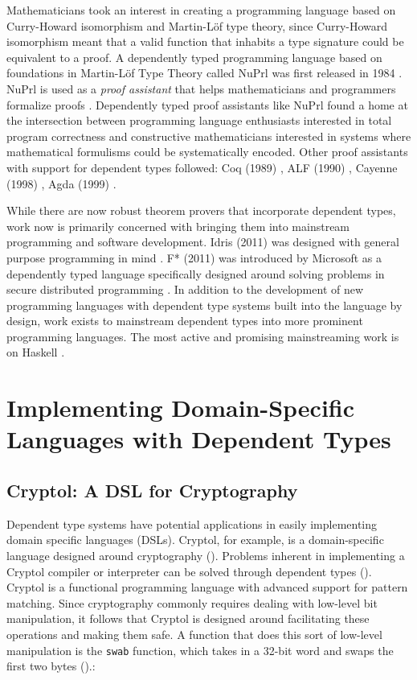 Mathematicians took an interest in creating a programming language based on
Curry-Howard isomorphism and Martin-L\"{o}f type theory, since Curry-Howard
isomorphism meant that a valid function that inhabits a type signature could be
equivalent to a proof. A dependently typed programming language based on
foundations in Martin-L\"{o}f Type Theory called NuPrl was first released in
1984 \cite{nuprl}. NuPrl is used as a \textit{proof assistant} that helps
mathematicians and programmers formalize proofs \cite{nuprl}. Dependently typed
proof assistants like NuPrl found a home at the intersection between programming
language enthusiasts interested in total program correctness and constructive
mathematicians interested in systems where mathematical formulisms could be
systematically encoded. Other proof assistants with support for dependent types
followed: Coq (1989) \cite{coquand1988calculus}, ALF (1990) \cite{alf}, Cayenne
(1998) \cite{nuprl}, Agda (1999) \cite{norell:thesis}.

While there are now robust theorem provers that incorporate dependent types,
work now is primarily concerned with bringing them into mainstream programming
and software development. Idris (2011) was designed with general purpose
programming in mind \cite{tdd_book}. F* (2011) was introduced by Microsoft as a
dependently typed language specifically designed around solving problems in
secure distributed programming \cite{fstar_distributed_programming}. In addition
to the development of new programming languages with dependent type systems
built into the language by design, work exists to mainstream dependent types
into more prominent programming languages. The most active and promising
mainstreaming work is on Haskell \cite{eisenberg2016,gundry2013}. 

\section{Implementing Domain-Specific Languages with Dependent Types}

\subsection{Cryptol: A DSL for Cryptography}

Dependent type systems have potential applications in easily implementing domain
specific languages (DSLs). Cryptol, for example, is a domain-specific language
designed around cryptography (\cite{cryptol_manual}). Problems inherent in
implementing a Cryptol compiler or interpreter can be solved through dependent
types (\cite{power_of_pi}). Cryptol is a functional programming language with
advanced support for pattern matching. Since cryptography commonly requires
dealing with low-level bit manipulation, it follows that Cryptol is designed
around facilitating these operations and making them safe. A function that does
this sort of low-level manipulation is the \texttt{swab} function, which takes
in a 32-bit word and swaps the first two bytes (\cite{cryptol_manual}).: 

